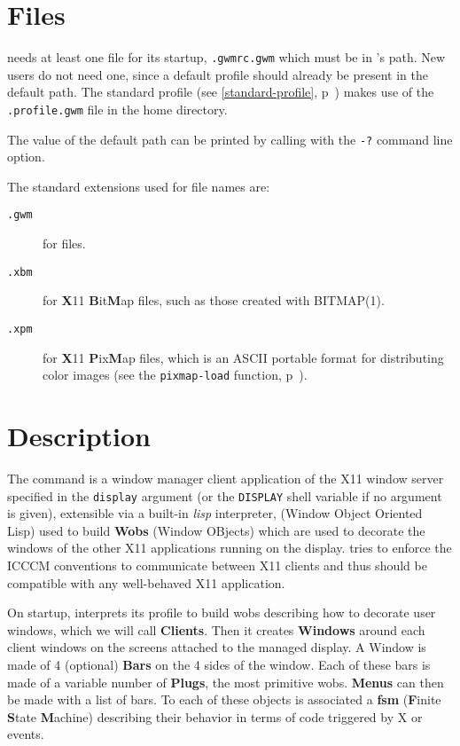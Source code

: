 \section{Files}

{\GWM} needs at least one file for its startup, \verb".gwmrc.gwm" which must
be in {\GWM}'s path. New users do not need one, since a default profile should
already be present in the default path. The standard profile (see
\ref{standard-profile}, p~\pageref{standard-profile}) makes use of the
\verb".profile.gwm" file in the home directory.

The value of the default path can be printed by calling {\GWM} with the
\verb"-?" command line option.

The standard extensions used for {\GWM} file names are:
\begin{description}
\item[{\tt .gwm}] for {\WOOL} files.
\item[{\tt .xbm}] for {\bf X}11 {\bf B}it{\bf M}ap files, such as those
created with BITMAP(1).
\item[{\tt .xpm}] for {\bf X}11 {\bf P}ix{\bf M}ap files, which is an ASCII
portable format for distributing color images (see the \verb"pixmap-load"
function, p~\pageref{pixmap-load}).
\end{description}

\section{Description}

The {\GWM} command is a window manager client application of the X11 window
server specified in the {\tt display} argument (or the  {\tt DISPLAY} shell
variable if no argument is given), extensible via a built-in {\it lisp}
interpreter, {\WOOL} (Window Object Oriented Lisp) used to build {\bf Wobs}
(Window OBjects) which are used to decorate the windows of the other X11
applications running on the display. {\GWM}
tries to enforce the ICCCM conventions to communicate between X11 clients
and thus should be compatible with any well-behaved X11 application.

On startup, {\GWM} interprets its profile to build wobs describing how to
decorate user windows, which we will call {\bf Clients}.  Then it creates
{\bf Windows} around each client windows on the screens attached to the
managed display. A Window is made of 4 (optional) {\bf Bars} on the 4 sides
of the window.  Each of these bars is made of a variable number of {\bf
Plugs}, the most primitive wobs.  {\bf Menus} can then be made with a list
of bars. To each of these objects is associated a {\bf fsm} ({\bf F}inite
{\bf S}tate {\bf M}achine) describing their behavior in terms of {\WOOL}
code triggered by X or {\WOOL} events.

